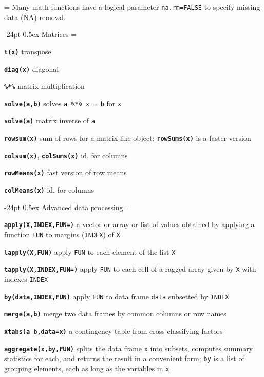\documentclass[10pt,landscape]{article}
\makeatletter
\renewcommand\section{\@startsection{section}{1}{0mm}%
                                     {-24pt}%
                                     {0.5ex}%
                                {\color{blue}\normalfont\large\bfseries}}
\newcommand{\code}{\texttt}
\newcommand{\bcode}[1]{\texttt{\textbf{#1}}}
\makeatother
\begin{document}
\begin{multicols*}{3}
\everypar={\hangindent=0mm}
Many math functions have a logical parameter \code{na.rm=FALSE} to
specify missing data (NA) removal.




\section{Matrices}
\everypar={\hangindent=9mm}

\bcode{t(x)} transpose

\bcode{diag(x)} diagonal

\bcode{\%*\%} matrix multiplication

\bcode{solve(a,b)} solves \code{a \%*\% x = b} for \code{x}

\bcode{solve(a)} matrix inverse of \code{a}

\bcode{rowsum(x)} sum of rows for a matrix-like object;
\bcode{rowSums(x)} is a faster version

\bcode{colsum(x)}, \bcode{colSums(x)} id. for columns

\bcode{rowMeans(x)} fast version of row means

\bcode{colMeans(x)} id. for columns





\section{Advanced data processing}
\everypar={\hangindent=9mm}

\bcode{apply(X,INDEX,FUN=)} a vector or array or list of values obtained by applying a
     function \code{FUN} to margins (\code{INDEX}) of \code{X}

\bcode{lapply(X,FUN)} apply \code{FUN} to each element of the list \code{X}

\bcode{tapply(X,INDEX,FUN=)} apply \code{FUN} to each cell
of a ragged array given by \code{X} with indexes \code{INDEX}

\bcode{by(data,INDEX,FUN)} apply \code{FUN} to data frame \code{data}
subsetted by \code{INDEX}

\bcode{merge(a,b)} merge two data frames by common columns or row names

\bcode{xtabs(a~b,data=x)} a contingency table from cross-classifying factors

\bcode{aggregate(x,by,FUN)} splits the data frame \code{x} into subsets, computes summary statistics for
     each, and returns the result in a convenient form; \code{by} is a
     list of grouping elements, each as long as the variables in \code{x}


\end{multicols*}
\end{document}
